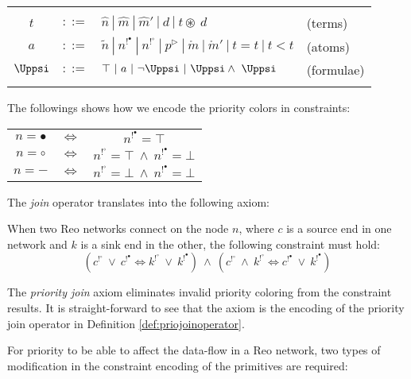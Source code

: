 \begin{tabular}{c c l l}
\centering
  & \\
  $t $&$::= $&$\hat{n}\ |\ \hat{m}\ |\ \hat{m}'\ |\ d\ |\ t \circledast \ d$ & (terms)\\
  $a $&$::=$&$ \tilde{n}\ |\ n^{!^\bullet}\ |\ n^{!^\circ}\ | \ p^\triangleright\ |\ \mathring{m}\ |\ \mathring{m}'\ |\ t=t\ |\ t<t $ & (atoms)\\
  $\Uppsi $&$::=$&$ \top \ | \ a\ |\ \neg \Uppsi \ | \ \Uppsi \wedge \ \Uppsi $ & (formulae)\\
  &
\end{tabular}

The followings shows how we encode the priority colors in constraints:

\begin{tabular}{c c c}
\centering
  $n = \bullet$ & $\Leftrightarrow$& $n^{!^\bullet} = \top$\\
  $n = \circ$  &$\Leftrightarrow$ &  $n^{!^\circ} = \top \ \wedge\  n^{!^\bullet} = \bot$\\
  $n = -$ &$\Leftrightarrow$ &$n^{!^\circ} = \bot \ \wedge\  n^{!^\bullet} = \bot$ \\
\end{tabular}



\noindent
The \emph{join} operator translates into the following axiom:

\begin{axiom}\label{ax:joinprio}
When two Reo networks connect on the node $n$, where $c$ is a source end in one network and $k$ is a sink end in the other, the following constraint must hold:
$$(c^{!^\circ}\ \vee\ c^{!^\bullet} \Leftrightarrow k^{!^\circ}\ \vee\ k^{!^\bullet}) \ \wedge \ (c^{!^\circ}\ \wedge\ k^{!^\circ} \Leftrightarrow c^{!^\bullet}\ \vee\ k^{!^\bullet})$$
\end{axiom}

The \emph{priority join} axiom eliminates invalid priority coloring from the constraint results. It is straight-forward to see that the axiom is the encoding of the priority join operator in Definition \ref{def:priojoinoperator}.

For priority to be able to affect the data-flow in a Reo network, two types of modification in the constraint encoding of the primitives are required: 

